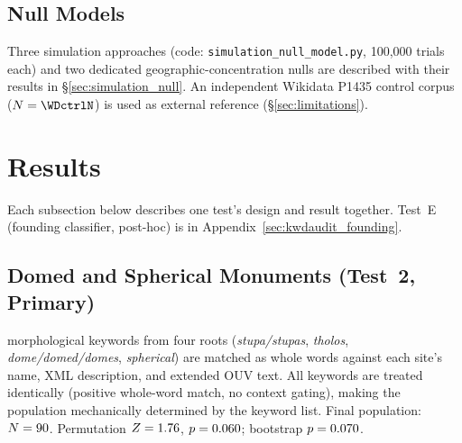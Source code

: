 \documentclass[12pt,a4paper]{article}
\begin{document}
\subsection{Null Models}
\label{sec:methods_simulation}

Three simulation approaches (code: \texttt{simulation\_null\_model.py},
100{,}000 trials each) and two dedicated geographic-concentration nulls
are described with their results in \S\ref{sec:simulation_null}.
An independent Wikidata P1435 control corpus ($N = \WDctrlN$) is used
as external reference (\S\ref{sec:limitations}).

\section{Results}
\label{sec:results}

Each subsection below describes one test's design and result together.
Test~E (founding classifier, post-hoc) is in Appendix~\ref{sec:kwdaudit_founding}.

\subsection{Domed and Spherical Monuments (Test~2, Primary)}
\label{sec:resultscircular}

\NcircKeywords{} morphological keywords from four roots
(\textit{stupa/stupas}, \textit{tholos}, \textit{dome/domed/domes},
\textit{spherical}) are matched as whole words against each site's
name, XML description, and extended OUV text.
All keywords are treated identically (positive whole-word match, no context
gating), making the population mechanically determined by the keyword list.
Final population: $N = 90$.
Permutation $Z = 1.76$,
$p = 0.060$; bootstrap $p = 0.070$.
\end{document}
